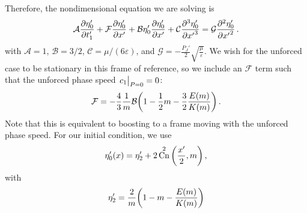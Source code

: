 \documentclass{jfm}
\DeclareMathOperator{\cn}{Cn}
\renewcommand*{\epsilon}{\varepsilon}
\begin{document}
Therefore, the nondimensional equation we are solving is
\begin{equation}
  \mathcal{A} \pdv{\eta'_0}{t'_1} + \mathcal{F} \pdv{\eta'_0}{x'} + \mathcal{B}
  \eta'_0 \pdv{\eta'_0}{x'} + \mathcal{C} \pdv[3]{\eta'_0}{{x'}} =
  \mathcal{G} \pdv[2]{\eta'_0}{{x'}} \,.
  \label{eq:kdvb_nondim}
\end{equation}
with $\mathcal{A} = 1$, $\mathcal{B} = 3/2$, $\mathcal{C} =
\mu/(6\epsilon)$, and $\mathcal{G} = -\frac{P_J'}{2}
\sqrt{\frac{\mu}{\epsilon}}$.
We wish for the unforced case to be stationary in this frame of
reference, so we include an $\mathcal{F}$ term such that the unforced
phase speed $\eval{c_1}_{P=0} = 0$:
\begin{equation}
  \mathcal{F} = -\frac{4}{3} \frac{1}{m} \mathcal{B}
    \pqty{1 - \frac{1}{2} m - \frac{3}{2} \frac{E(m)}{K(m)}} \,.
\end{equation}
Note that this is equivalent to boosting to a frame moving with the
unforced phase speed.
For our initial condition, we use
\begin{equation}
  \eta'_0(x) = \eta'_2 + 2 \cn^2\pqty{\frac{x'}{2} , m} \,,
  \label{eq:initial_cond_nondim}
\end{equation}
with
\begin{equation}
  \eta'_2 = \frac{2}{m} \pqty{1 - m - \frac{E(m)}{K(m)}}
\end{equation}
\end{document}
